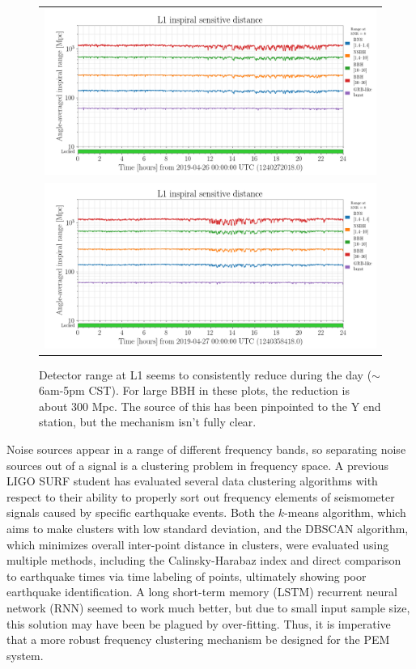 \begin{figure}
  \begin{minipage}[c]{0.67\textwidth}
  \begin{tabular}{c}
  \includegraphics[width=\textwidth]{assets/L1-LOCKED_216737_RANGE-1240272018-86400.png}   \\  \includegraphics[width=\textwidth]{assets/L1-LOCKED_216737_RANGE-1240358418-86400.png}
  \end{tabular}
  \end{minipage}\hfill
  \begin{minipage}[t]{0.3\textwidth}
    \caption{Detector range at L1 seems to consistently reduce during the day ($\sim$6am-5pm CST). For large BBH in these plots, the reduction is about 300 Mpc. The source of this has been pinpointed to the Y end station, but the mechanism isn't fully clear.}
  \end{minipage}
\end{figure}

Noise sources appear in a range of different frequency bands, so separating noise sources out of a signal is a clustering problem in frequency space.
A previous LIGO SURF student has evaluated several data clustering algorithms with respect to their ability to properly sort out frequency elements of seismometer signals caused by specific earthquake events\cite{roxana}.
Both the $k$-means algorithm, which aims to make clusters with low standard deviation, and the DBSCAN algorithm, which minimizes overall inter-point distance in clusters, were evaluated using multiple methods, including the Calinsky-Harabaz  index and direct comparison to earthquake times via time labeling of points, ultimately showing poor earthquake identification.
A long short-term memory (LSTM) recurrent neural network (RNN) seemed to work much better, but due to small input sample size, this solution may have been be plagued by over-fitting.
Thus, it is imperative that a more robust frequency clustering mechanism be designed for the PEM system.

